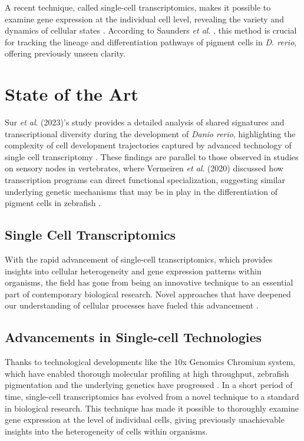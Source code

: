 \documentclass[runningheads]{llncs}
\begin{document}
A recent technique, called single-cell transcriptomics, makes it possible to examine gene expression at the individual cell level, revealing the variety and dynamics of cellular states \cite{nayak2021hitchhiker}. According to Saunders \textit{et al}. \cite{saunders2023embryo}, this method is crucial for tracking the lineage and differentiation pathways of pigment cells in \textit{D. rerio}, offering previously unseen clarity.

\section{State of the Art}
Sur \textit{et al}. (2023)'s study provides a detailed analysis of shared signatures and transcriptional diversity during the development of \textit{Danio rerio}, highlighting the complexity of cell development trajectories captured by advanced technology of single cell transcriptomy \cite{sur2023single}. These findings are parallel to those observed in studies on sensory nodes in vertebrates, where Vermeiren \textit{et al}. (2020) discussed how transcription programs can direct functional specialization, suggesting similar underlying genetic mechanisms that may be in play in the differentiation of pigment cells in zebrafish \cite{vermeiren2020vertebrate}.

\subsection{Single Cell Transcriptomics}
With the rapid advancement of single-cell transcriptomics, which provides insights into cellular heterogeneity and gene expression patterns within organisms, the field has gone from being an innovative technique to an essential part of contemporary biological research. Novel approaches that have deepened our understanding of cellular processes have fueled this advancement \cite{kulkarni2019beyond}.

\subsection{Advancements in Single-cell Technologies}
Thanks to technological developments like the 10x Genomics Chromium system, which have enabled thorough molecular profiling at high throughput, zebrafish pigmentation and the underlying genetics have progressed \cite{srivatsan2020massively}. In a short period of time, single-cell transcriptomics has evolved from a novel technique to a standard in biological research. This technique has made it possible to thoroughly examine gene expression at the level of individual cells, giving previously unachievable insights into the heterogeneity of cells within organisms. 
\end{document}
